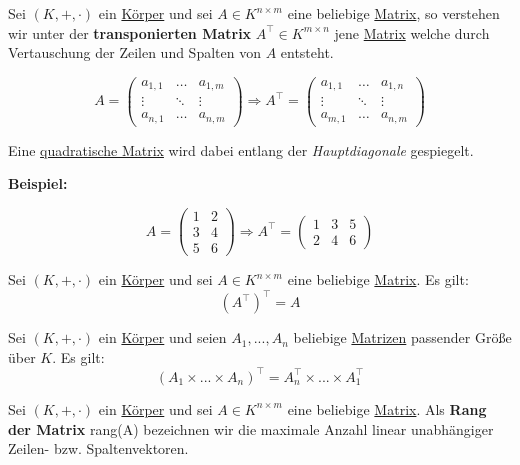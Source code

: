 \documentclass[../../main.tex]{subfiles}
\begin{document}
	\begin{definition}
		\label{def:Transponieren}
		\label{def:transponierteMatrix}
		Sei $(K,+,\cdot)$ ein \hyperref[def:Körper]{Körper} und sei $A\in K^{n \times m}$ eine beliebige \hyperref[def:Matrix]{Matrix}, so verstehen wir unter der \textbf{transponierten Matrix} $A^\top \in K^{m \times n}$ jene \hyperref[def:Matrix]{Matrix} welche durch Vertauschung der Zeilen und Spalten von $A$ entsteht.
		
		$$A = \begin{pmatrix} a_{1,1} & \dots & a_{1,m} \\ \vdots & \ddots & \vdots \\ a_{n,1} & \dots & a_{n,m} \end{pmatrix} \Rightarrow A^\top = \begin{pmatrix} a_{1,1} & \dots & a_{1,n} \\ \vdots & \ddots & \vdots \\ a_{m,1} & \dots & a_{n,m} \end{pmatrix}$$
		
		Eine \hyperref[def:QuadratischeMatrix]{quadratische Matrix} wird dabei entlang der \textit{Hauptdiagonale} gespiegelt. 
		
		\textbf{Beispiel:}
		
		$$A = \begin{pmatrix} 1 & 2 \\ 3 & 4 \\ 5 & 6 \end{pmatrix} \Rightarrow A^\top = \begin{pmatrix} 1 & 3 & 5 \\ 2 & 4 & 6 \end{pmatrix}$$
	\end{definition}

	\begin{theorem}
		Sei $(K,+,\cdot)$ ein \hyperref[def:Körper]{Körper} und sei $A\in K^{n \times m}$ eine beliebige \hyperref[def:Matrix]{Matrix}. Es gilt: $$(A^\top)^\top = A$$
	\end{theorem}

	\begin{theorem}
		Sei $(K,+,\cdot)$ ein \hyperref[def:Körper]{Körper} und seien $A_1,...,A_n$ beliebige \hyperref[def:Matrix]{Matrizen} passender Größe über $K$. Es gilt: $$(A_1 \times ... \times A_n)^\top = A_n^\top \times ... \times A_1^\top$$
	\end{theorem}

	\begin{definition}
		\label{def:RangMatrix}
		Sei $(K,+,\cdot)$ ein \hyperref[def:Körper]{Körper} und sei $A\in K^{n \times m}$ eine beliebige \hyperref[def:Matrix]{Matrix}. Als \textbf{Rang der Matrix} \textrm{rang}(A) bezeichnen wir die maximale Anzahl linear unabhängiger Zeilen- bzw. Spaltenvektoren.
	\end{definition}
	
\end{document}
